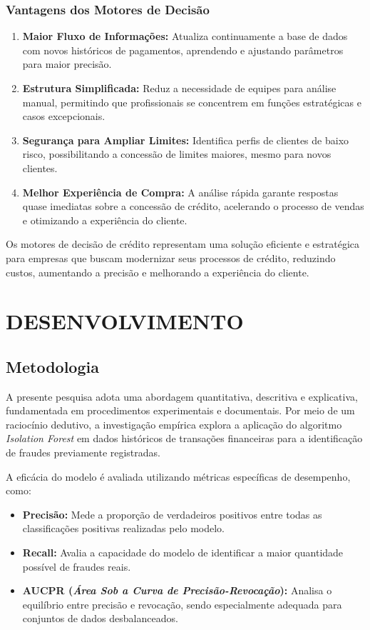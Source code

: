 \documentclass[12pt,a4paper]{article}
\begin{document}
\subsubsection{Vantagens dos Motores de Decisão}

\begin{enumerate}
    \item \textbf{Maior Fluxo de Informações:} Atualiza continuamente a base de dados com novos históricos de pagamentos, aprendendo e ajustando parâmetros para maior precisão.
    \item \textbf{Estrutura Simplificada:} Reduz a necessidade de equipes para análise manual, permitindo que profissionais se concentrem em funções estratégicas e casos excepcionais.
    \item \textbf{Segurança para Ampliar Limites:} Identifica perfis de clientes de baixo risco, possibilitando a concessão de limites maiores, mesmo para novos clientes.
    \item \textbf{Melhor Experiência de Compra:} A análise rápida garante respostas quase imediatas sobre a concessão de crédito, acelerando o processo de vendas e otimizando a experiência do cliente.
\end{enumerate}

Os motores de decisão de crédito representam uma solução eficiente e estratégica para empresas que buscam modernizar seus processos de crédito, reduzindo custos, aumentando a precisão e melhorando a experiência do cliente.

\section{DESENVOLVIMENTO}
\subsection{Metodologia}

A presente pesquisa adota uma abordagem quantitativa, descritiva e explicativa, fundamentada em procedimentos experimentais e documentais. Por meio de um raciocínio dedutivo, a investigação empírica explora a aplicação do algoritmo \textit{Isolation Forest} em dados históricos de transações financeiras para a identificação de fraudes previamente registradas. 

A eficácia do modelo é avaliada utilizando métricas específicas de desempenho, como:
\begin{itemize}
    \item \textbf{Precisão:} Mede a proporção de verdadeiros positivos entre todas as classificações positivas realizadas pelo modelo.
    \item \textbf{Recall:} Avalia a capacidade do modelo de identificar a maior quantidade possível de fraudes reais.
    \item \textbf{AUCPR (\textit{Área Sob a Curva de Precisão-Revocação}):} Analisa o equilíbrio entre precisão e revocação, sendo especialmente adequada para conjuntos de dados desbalanceados.
\end{itemize}
\end{document}

